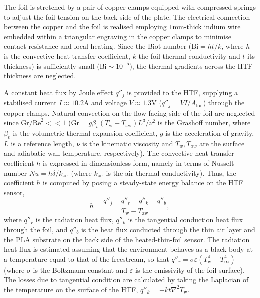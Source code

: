 The foil is stretched by a pair of copper clamps equipped with compressed springs to adjust the foil tension on the back side of the plate. The electrical connection between the copper and the foil is realised employing $1\mathrm{mm}$-thick indium wire embedded within a triangular engraving in the copper clamps to minimise contact resistance and local heating. Since the Biot number ($\mathrm{Bi} = h t/k$, where $h$ is the convective heat transfer coefficient, $k$ the foil thermal conductivity and $t$ its thickness) is sufficiently small ($\mathrm{Bi} \sim 10^{-5}$), the thermal gradients across the HTF thickness are neglected. 

A constant heat flux by Joule effect $q''_{j}$ is provided to the HTF, supplying a stabilised current $I \approx 10.2\mathrm{A}$ and voltage $V \approx 1.3\mathrm{V}$ ($q''_{j} = V I / A_{\mathrm{foil}}$) through the copper clamps. Natural convection on the flow-facing side of the foil are neglected since $\mathrm{Gr/Re}^2<< 1$ ($\mathrm{Gr} = {g\beta_v(T_\mathrm{w}-T_\mathrm{aw}) L^3}/{\nu^2}$ is the Grashoff number, where $\beta_v$ is the volumetric thermal expansion coefficient, $g$ is the acceleration of gravity, $L$ is a reference length, $\nu$ is the kinematic viscosity and $T_w, T_{aw}$ are the surface and adiabatic wall temperature, respectively). The convective heat transfer coefficient $h$ is expressed in dimensionless form, namely in terms of Nusselt number $Nu = h \delta/k_{\mathrm{air}}$ (where $k_{\mathrm{air}}$ is the air thermal conductivity). Thus, the coefficient $h$ is computed by posing a steady-state energy balance on the HTF sensor,
\begin{equation}
	h = \frac{ q''_{j} - q''_{r} - q''_{k} - q''_{b} }{ T_\mathrm{w} - T_\mathrm{aw} } ,
	\label{eq:heatedthinfoil}
\end{equation}
where $q''_{r}$ is the radiation heat flux, $q''_{k}$ is the tangential conduction heat flux through the foil, and $q''_{b}$ is the heat flux conducted through the thin air layer and the PLA substrate on the back side of the heated-thin-foil sensor. The radiation heat flux is estimated assuming that the environment behaves as a black body at a temperature equal to that of the freestream, so that $q''_{r} = \sigma \varepsilon (T_\mathrm{w}^4 - T_\infty^4)$ (where $\sigma$ is the Boltzmann constant and $\varepsilon$ is the emissivity of the foil surface). The losses due to tangential condition are calculated by taking the Laplacian of the temperature on the surface of the HTF, $q''_{k} = -kt \nabla^{2} T_\mathrm{w}$.
